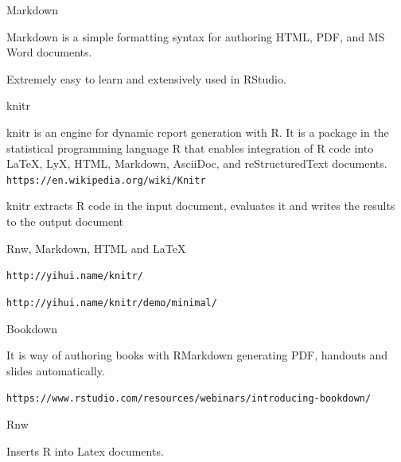 \documentclass{beamer}
\begin{document}

\begin{frame}{Markdown} %

Markdown is a simple formatting syntax for authoring HTML, PDF, and MS Word documents. 

Extremely easy to learn and extensively used in RStudio.

\end{frame}


\begin{frame}{knitr} %

knitr is an engine for dynamic report generation with R. It is a package in the statistical programming language R that enables integration of R code into LaTeX, LyX, HTML, Markdown, AsciiDoc, and reStructuredText documents.
\texttt{https://en.wikipedia.org/wiki/Knitr}

knitr extracts R code in the input document, evaluates it and writes the results to the output document

Rnw, Markdown, HTML and LaTeX

\texttt{http://yihui.name/knitr/}

\texttt{http://yihui.name/knitr/demo/minimal/}


\end{frame}




\begin{frame}{Bookdown} %

It is way of authoring books with RMarkdown generating PDF, handouts and slides automatically.

\texttt{https://www.rstudio.com/resources/webinars/introducing-bookdown/}

\end{frame}



\begin{frame}{Rnw} %

Inserts R into Latex documents.

\end{frame}

\end{document}
